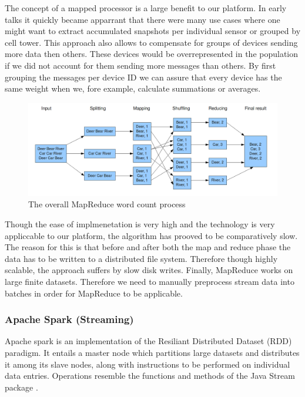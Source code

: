 The concept of a mapped processor is a large benefit to our platform. In early talks it quickly became apparrant that there were many use cases where one might want to extract accumulated snapshots per individual sensor or grouped by cell tower. This approach also allows to compensate for groups of devices sending more data then others. These devices would be overrepresented in the population if we did not account for them sending more messages than others. By first grouping the messages per device ID we can assure that every device has the same weight when we, fore example, calculate summations or averages.

\begin{figure}
\centering
\includegraphics[width=\textwidth]{resources/img/mapreduce.png}
\caption{The overall MapReduce word count process\cite{mapreduce_img}}
\label{img:mapreduce}
\end{figure}

Though the ease of implmenetation is very high and the technology is very appliccable to our platform, the algorithm has prooved to be comparatively slow. The reason for this is that before and after both the map and reduce phase the data has to be written to a distributed file system. Therefore though highly scalable, the approach suffers by slow disk writes\cite{mpareduce vs spark}. Finally, MapReduce works on large finite datasets. Therefore we need to manually preprocess stream data into batches in order for MapReduce to be applicable\cite{stream mapreduce}.

\subsubsection{Apache Spark (Streaming)}
Apache spark is an implementation of the Resiliant Distributed Dataset (RDD) paradigm. It entails a master node which partitions large datasets and distributes it among its slave nodes, along with instructions to be performed on individual data entries. Operations resemble the functions and methods of the Java Stream package \cite{java_stream}. 


